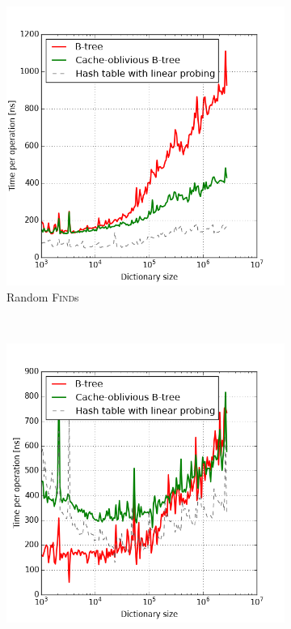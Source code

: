 \begin{figure}
\centering
\begin{subfigure}[t]{0.45\textwidth}
	\includegraphics[width=\textwidth]{img/performance/cob-performance-1}
	\caption{Random \textsc{Find}s}
\end{subfigure}
~
\begin{subfigure}[t]{0.45\textwidth}
	\includegraphics[width=\textwidth]{img/performance/cob-performance-2}

\end{subfigure}
\end{figure}
